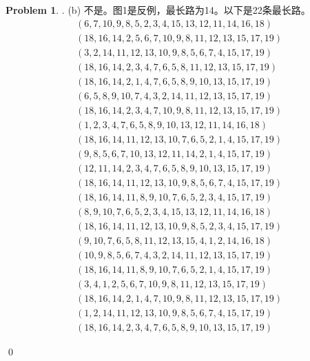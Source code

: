 \documentclass[UTF8]{ctexart}
\newenvironment{sol}
  {\par\vspace{3mm}\noindent{\it Solution}.}
  {\qed \\ \medskip}
\theoremstyle{definition}
\newtheorem{problem}{Problem}
\begin{document}
\begin{problem}
\begin{sol}
(b) 不是。图1是反例，最长路为14。以下是22条最长路。
\begin{align*}
  (6, 7, 10, 9, 8, 5, 2, 3, 4, 15, 13, 12, 11, 14, 16, 18)\\
   (18, 16, 14, 2, 5, 6, 7, 10, 9, 8, 11, 12, 13, 15, 17, 19)\\
   (3, 2, 14, 11, 12, 13, 10, 9, 8, 5, 6, 7, 4, 15, 17, 19)\\
   (18, 16, 14, 2, 3, 4, 7, 6, 5, 8, 11, 12, 13, 15, 17, 19)\\
   (18, 16, 14, 2, 1, 4, 7, 6, 5, 8, 9, 10, 13, 15, 17, 19)\\
   (6, 5, 8, 9, 10, 7, 4, 3, 2, 14, 11, 12, 13, 15, 17, 19)\\
   (18, 16, 14, 2, 3, 4, 7, 10, 9, 8, 11, 12, 13, 15, 17, 19)\\
   (1, 2, 3, 4, 7, 6, 5, 8, 9, 10, 13, 12, 11, 14, 16, 18)\\
   (18, 16, 14, 11, 12, 13, 10, 7, 6, 5, 2, 1, 4, 15, 17, 19)\\
   (9, 8, 5, 6, 7, 10, 13, 12, 11, 14, 2, 1, 4, 15, 17, 19)\\
   (12, 11, 14, 2, 3, 4, 7, 6, 5, 8, 9, 10, 13, 15, 17, 19)\\
   (18, 16, 14, 11, 12, 13, 10, 9, 8, 5, 6, 7, 4, 15, 17, 19)\\
   (18, 16, 14, 11, 8, 9, 10, 7, 6, 5, 2, 3, 4, 15, 17, 19)\\
   (8, 9, 10, 7, 6, 5, 2, 3, 4, 15, 13, 12, 11, 14, 16, 18)\\
   (18, 16, 14, 11, 12, 13, 10, 9, 8, 5, 2, 3, 4, 15, 17, 19)\\
   (9, 10, 7, 6, 5, 8, 11, 12, 13, 15, 4, 1, 2, 14, 16, 18)\\
   (10, 9, 8, 5, 6, 7, 4, 3, 2, 14, 11, 12, 13, 15, 17, 19)\\
   (18, 16, 14, 11, 8, 9, 10, 7, 6, 5, 2, 1, 4, 15, 17, 19)\\
   (3, 4, 1, 2, 5, 6, 7, 10, 9, 8, 11, 12, 13, 15, 17, 19)\\
   (18, 16, 14, 2, 1, 4, 7, 10, 9, 8, 11, 12, 13, 15, 17, 19)\\
   (1, 2, 14, 11, 12, 13, 10, 9, 8, 5, 6, 7, 4, 15, 17, 19)\\
   (18, 16, 14, 2, 3, 4, 7, 6, 5, 8, 9, 10, 13, 15, 17, 19)
\end{align*}


\end{sol}
\end{problem}
\end{document}
